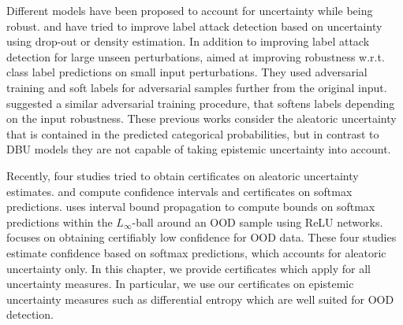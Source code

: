Different models have been proposed to account for uncertainty while being robust.  \citep{smith2018} and \citep{simple_ood_adv_detection} have tried to improve label attack detection based on uncertainty using drop-out or density estimation. In addition to improving label attack detection for large unseen perturbations, \citep{stutz2020} aimed at improving robustness w.r.t. class label predictions on small input perturbations. They used adversarial training and soft labels for adversarial samples further from the original input. \citep{qin2020} suggested a similar adversarial training procedure, that softens labels depending on the input robustness. These previous works consider the aleatoric uncertainty that is contained in the predicted categorical probabilities, but in contrast to DBU models they are not capable of taking epistemic uncertainty into account. 



Recently, four studies tried to obtain certificates on aleatoric uncertainty estimates. \citep{single_model_quantile} and \citep{confidence_certificate_rs} compute confidence intervals and certificates on softmax predictions. \citep{bitterwolf2020} uses interval bound propagation to compute bounds on softmax predictions within the $L_{\infty}$-ball around an OOD sample using ReLU networks. \citep{provable-uncertainty} focuses on obtaining certifiably low confidence for OOD data. These four studies estimate confidence based on softmax predictions, which accounts for aleatoric uncertainty only. In this chapter, we provide certificates which apply for all uncertainty measures. In particular, we use our certificates on epistemic uncertainty measures such as differential entropy which are well suited for OOD detection.



